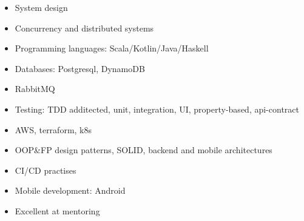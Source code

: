  \begin{multicols}{2}
    \begin{itemize}
      \item System design
      \item Concurrency and distributed systems 
	    \item Programming languages: Scala/Kotlin/Java/Haskell
        \item Databases: Postgresql, DynamoDB
          \item  RabbitMQ
	    \item Testing: TDD additected, unit, integration, UI, property-based, api-contract 
        \item AWS, terraform, k8s 
	    \item OOP\&FP design patterns, SOLID, backend and mobile architectures
	    \item CI/CD practises 
        \item Mobile development: Android 
	    \item Excellent at mentoring 
    \end{itemize}
 \end{multicols}
